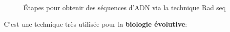 \documentclass[a4paper]{article}
\begin{document}
\begin{figure}[!h]
\caption{Étapes pour obtenir des séquences d'ADN via la technique Rad seq}
\end{figure}

C'est une technique très utilisée pour la \textbf{biologie évolutive}:
\end{document}
